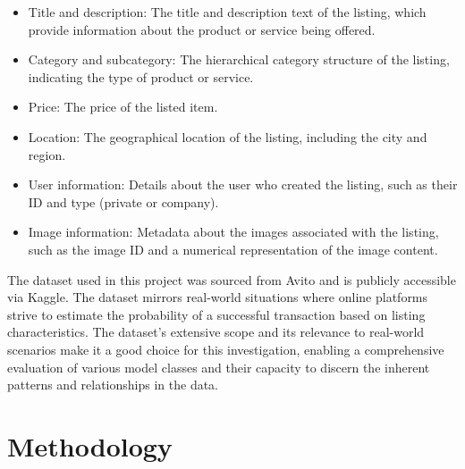 \documentclass{article}
\begin{document}
\begin{itemize}
    \item Title and description: The title and description text of the listing, which provide information about the product or service being offered.
    \item Category and subcategory: The hierarchical category structure of the listing, indicating the type of product or service.
    \item Price: The price of the listed item.
    \item Location: The geographical location of the listing, including the city and region.
    \item User information: Details about the user who created the listing, such as their ID and type (private or company).
    \item Image information: Metadata about the images associated with the listing, such as the image ID and a numerical representation of the image content.
\end{itemize}

The dataset used in this project was sourced from Avito and is publicly accessible via Kaggle. The dataset mirrors real-world situations where online platforms strive to estimate the probability of a successful transaction based on listing characteristics. The dataset’s extensive scope and its relevance to real-world scenarios make it a good choice for this investigation, enabling a comprehensive evaluation of various model classes and their capacity to discern the inherent patterns and relationships in the data.

\section{Methodology}
\end{document}
